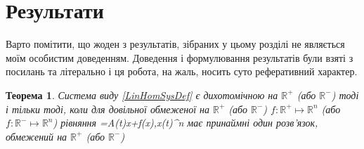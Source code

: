 \documentclass[14pt]{extarticle} %
\newtheorem{theorem}{Теорема}
\theoremstyle{remark}
\begin{document}
\section{Результати}
Варто помітити, що жоден з результатів, зібраних у цьому розділі не являється моїм особистим доведенням. Доведення і формулювання результатів
були взяті з посилань \cite{krein} та \cite{mitrop} літерально і ця робота, на жаль, носить суто реферативний характер.
\begin{theorem}
	Система виду \ref{LinHomSysDef} є дихотомічною на $\mathbb{R}^+$ (або $\mathbb{R}^-$) тоді і тільки тоді, коли для довільної обмеженої на
	$\mathbb{R}^+$ (або $\mathbb{R}^-$) $f:\mathbb{R}^+\mapsto\mathbb{R}^n$ (або $f:\mathbb{R}^-\mapsto\mathbb{R}^n$) рівняння 
	\equation\label{LinHomPerturbedSysDef}=A(t)x+f(x),\;x(t)\in{}^n\endequation
	має принаймні один розв’язок, обмежений на $\mathbb{R}^+$ (або $\mathbb{R}^-$)
\end{theorem}
\end{document}
